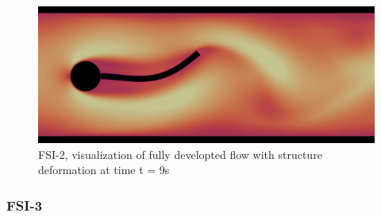 \begin{figure}[h!]
  \centering
    \includegraphics[scale=0.2]{./Fig/fsi2flow.png}
      \caption{FSI-2, visualization of fully developted flow with structure deformation at time t = 9s}
\end{figure}

\newpage
\subsubsection{FSI-3}

